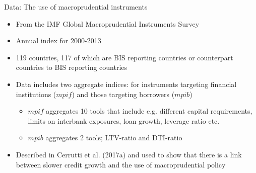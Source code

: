 \documentclass{beamer}
\begin{document}
\begin{frame}{Data: The use of macroprudential instruments}
\begin{itemize}
\item From the IMF Global Macroprudential Instruments Survey
\item Annual index for 2000-2013
\item 119 countries, 117 of which are BIS reporting countries or counterpart countries to BIS reporting countries 
\item Data includes two aggregate indices: for instruments targeting financial institutions ($mpif$) and those targeting borrowers ($mpib$)
\begin{itemize}
\item $mpif$ aggregates 10 tools that include e.g. different capital requirements, limits on interbank exposures, loan growth, leverage ratio etc.
\item $mpib$ aggregates 2 tools; LTV-ratio and DTI-ratio
\end{itemize}
\item Described in Cerrutti et al. (2017a) and used to show that there is a link between slower credit growth and the use of macroprudential policy
\end{itemize}
\end{frame}

\end{document}
